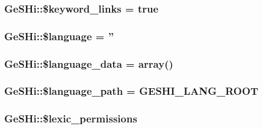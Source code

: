 \hypertarget{class_ge_s_hi_acebed51fe215de45f23093f55e8a627a}{
\subsubsection[{\$keyword\-\_\-links}]{\setlength{\rightskip}{0pt plus 5cm}Ge\-S\-Hi\-::\$keyword\-\_\-links = true}}\label{class_ge_s_hi_acebed51fe215de45f23093f55e8a627a}
\hypertarget{class_ge_s_hi_a9cd2cd4b5f31a550b7fc165d845ade76}{
\subsubsection[{\$language}]{\setlength{\rightskip}{0pt plus 5cm}Ge\-S\-Hi\-::\$language = ''}}\label{class_ge_s_hi_a9cd2cd4b5f31a550b7fc165d845ade76}
\hypertarget{class_ge_s_hi_a4d68083973f3b2b1ac8450f21f12474f}{
\subsubsection[{\$language\-\_\-data}]{\setlength{\rightskip}{0pt plus 5cm}Ge\-S\-Hi\-::\$language\-\_\-data = array()}}\label{class_ge_s_hi_a4d68083973f3b2b1ac8450f21f12474f}
\hypertarget{class_ge_s_hi_a91edb12680e98dcbf0e0f660374bb6c0}{
\subsubsection[{\$language\-\_\-path}]{\setlength{\rightskip}{0pt plus 5cm}Ge\-S\-Hi\-::\$language\-\_\-path = {\bf G\-E\-S\-H\-I\-\_\-\-L\-A\-N\-G\-\_\-\-R\-O\-O\-T}}}\label{class_ge_s_hi_a91edb12680e98dcbf0e0f660374bb6c0}
\hypertarget{class_ge_s_hi_a3f8c0387259efaf34989e0653b083051}{
\subsubsection[{\$lexic\-\_\-permissions}]{\setlength{\rightskip}{0pt plus 5cm}Ge\-S\-Hi\-::\$lexic\-\_\-permissions}}\label{class_ge_s_hi_a3f8c0387259efaf34989e0653b083051}
